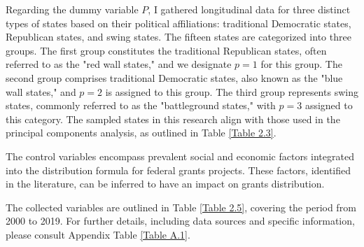\documentclass[man]{apa7}
\begin{document}
Regarding the dummy variable $P$, I gathered longitudinal data for three distinct types of states based on their political affiliations: traditional Democratic states, Republican states, and swing states. The fifteen states are categorized into three groups. The first group constitutes the traditional Republican states, often referred to as the "red wall states," and we designate $p = 1$ for this group. The second group comprises traditional Democratic states, also known as the "blue wall states," and $p = 2$ is assigned to this group. The third group represents swing states, commonly referred to as the "battleground states," with $p = 3$ assigned to this category. The sampled states in this research align with those used in the principal components analysis, as outlined in Table \ref{Table 2.3}.


The control variables encompass prevalent social and economic factors integrated into the distribution formula for federal grants projects. These factors, identified in the literature, can be inferred to have an impact on grants distribution.


The collected variables are outlined in Table \ref{Table 2.5}, covering the period from 2000 to 2019. For further details, including data sources and specific information, please consult Appendix Table \ref{Table A.1}.
\end{document}
